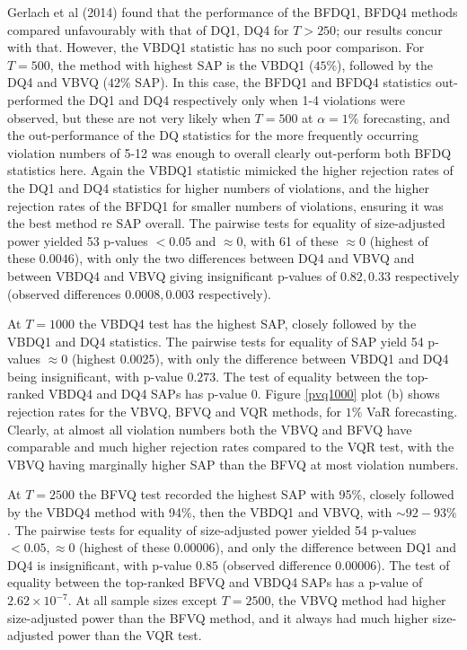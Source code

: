 \documentclass[12pt,epsf]{article}
\begin{document}
Gerlach et al (2014) found that the performance of the BFDQ1, BFDQ4 methods compared unfavourably with that of
DQ1, DQ4 for $T>250$; our results concur with that. However, the VBDQ1 statistic has no such poor comparison.
For $T=500$, the method with highest SAP is the VBDQ1 ($45\%$), followed by the
DQ4 and VBVQ ($42\%$ SAP). In this case, the BFDQ1 and BFDQ4 statistics out-performed the DQ1 and DQ4 respectively
only when 1-4 violations were observed, but these are not very likely when $T=500$ at $\alpha=1\%$ forecasting, and the
out-performance of the DQ statistics for the more frequently occurring violation numbers of 5-12 was enough to
overall clearly out-perform both BFDQ statistics here. Again the VBDQ1 statistic mimicked the higher rejection
rates of the DQ1 and DQ4 statistics for higher numbers of violations, and the higher rejection rates of the BFDQ1 for smaller
numbers of violations, ensuring it was the best method re SAP overall. The pairwise tests for equality of size-adjusted
power yielded 53 p-values $<0.05$ and $\approx 0$, with 61 of these $\approx 0$ (highest of these $0.0046$), with only the two
differences between DQ4 and VBVQ and between VBDQ4 and VBVQ giving insignificant p-values of $0.82, 0.33$ respectively (observed differences
$0.0008, 0.003$ respectively).

At $T=1000$ the VBDQ4 test has the highest SAP, closely followed by the VBDQ1 and DQ4 statistics. The pairwise tests for equality
of SAP yield 54 p-values $\approx 0$ (highest 0.0025), with only the difference between VBDQ1 and DQ4 being
insignificant, with p-value $0.273$. The test of equality between the top-ranked VBDQ4 and DQ4 SAPs has p-value $0$. Figure \ref{pvq1000}
plot (b) shows rejection rates for the VBVQ, BFVQ and VQR methods, for $1\%$ VaR forecasting. Clearly, at almost all violation numbers 
both the VBVQ and BFVQ have comparable and much higher rejection rates compared to the VQR test, with the VBVQ having marginally 
higher SAP than the BFVQ at most violation numbers.

At $T=2500$ the BFVQ test recorded the highest SAP with 95\%, closely followed by the VBDQ4 method with 94\%, then
the VBDQ1 and VBVQ, with $\sim 92-93\%$. The pairwise tests for equality of size-adjusted
power yielded 54 p-values $<0.05, \approx 0$ (highest of these $0.00006$), and only the difference between
DQ1 and DQ4 is insignificant, with p-value $0.85$ (observed difference $0.00006$).
The test of equality between the top-ranked BFVQ and VBDQ4 SAPs has a p-value
of $2.62 \times 10^{-7}$. At all sample sizes except $T=2500$, the VBVQ method had higher
size-adjusted power than the BFVQ method, and it always had much higher size-adjusted power than the VQR test.
\end{document}
